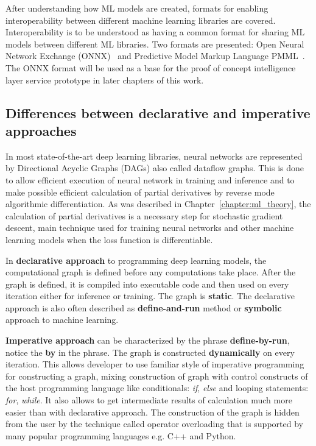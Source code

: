 \documentclass[english, 12pt, a4paper, elec, utf8, online]{aaltothesis}
\begin{document}
After understanding how ML models are created, formats for enabling interoperability between different machine learning libraries are covered. Interoperability is to be understood as having a common format for sharing ML models between different ML libraries. Two formats are presented: Open Neural Network Exchange (ONNX)~\cite{hazelwood2018applied} and Predictive Model Markup Language PMML~\cite{guazzelli2009pmml}. The ONNX format will be used as a base for the proof of concept intelligence layer service prototype in later chapters of this work.

\subsection{Differences between declarative and imperative approaches}
In most state-of-the-art deep learning libraries, neural networks are represented by Directional Acyclic Graphs (DAGs) also called dataflow graphs. This is done to allow efficient execution of neural network in training and inference and to make possible efficient calculation of partial derivatives by reverse mode algorithmic differentiation. As was described in Chapter~\ref{chapter:ml_theory}, the calculation of partial derivatives is a necessary step for stochastic gradient descent, main technique used for training neural networks and other machine learning models when the loss function is differentiable.

In \textbf{declarative approach} to programming deep learning models, the computational graph is defined before any computations take place. After the graph is defined, it is compiled into executable code and then used on every iteration either for inference or training. The graph is \textbf{static}. The declarative approach is also often described as \textbf{define-and-run} method or \textbf{symbolic} approach to machine learning.

\textbf{Imperative approach} can be characterized by the phrase \textbf{define-by-run}, notice the \textbf{by} in the phrase. The graph is constructed \textbf{dynamically} on every iteration. This allows developer to use familiar style of imperative programming for constructing a graph, mixing construction of graph with control constructs of the host programming language like conditionals: \textit{if}, \textit{else} and looping statements: \textit{for}, \textit{while}. It also allows to get intermediate results of calculation much more easier than with declarative approach. The construction of the graph is hidden from the user by the technique called operator overloading that is supported by many popular programming languages e.g. C++ and Python.
\end{document}
